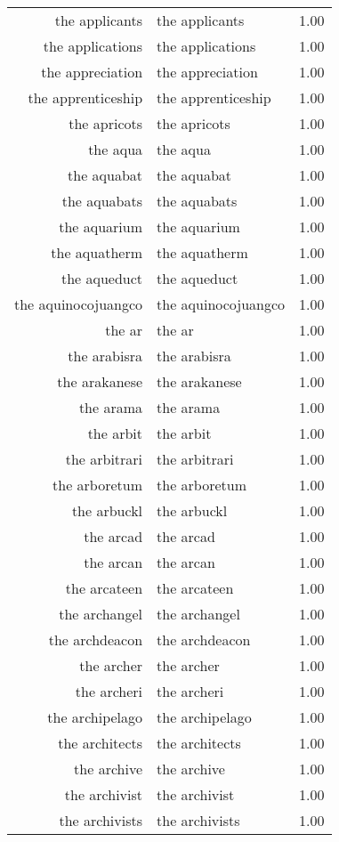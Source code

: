 \begin{table}[ht]
\begin{tabular}{rlr}
  the applicants & the applicants & 1.00 \\ 
  the applications & the applications & 1.00 \\ 
  the appreciation & the appreciation & 1.00 \\ 
  the apprenticeship & the apprenticeship & 1.00 \\ 
  the apricots & the apricots & 1.00 \\ 
  the aqua & the aqua & 1.00 \\ 
  the aquabat & the aquabat & 1.00 \\ 
  the aquabats & the aquabats & 1.00 \\ 
  the aquarium & the aquarium & 1.00 \\ 
  the aquatherm & the aquatherm & 1.00 \\ 
  the aqueduct & the aqueduct & 1.00 \\ 
  the aquinocojuangco & the aquinocojuangco & 1.00 \\ 
  the ar & the ar & 1.00 \\ 
  the arabisra & the arabisra & 1.00 \\ 
  the arakanese & the arakanese & 1.00 \\ 
  the arama & the arama & 1.00 \\ 
  the arbit & the arbit & 1.00 \\ 
  the arbitrari & the arbitrari & 1.00 \\ 
  the arboretum & the arboretum & 1.00 \\ 
  the arbuckl & the arbuckl & 1.00 \\ 
  the arcad & the arcad & 1.00 \\ 
  the arcan & the arcan & 1.00 \\ 
  the arcateen & the arcateen & 1.00 \\ 
  the archangel & the archangel & 1.00 \\ 
  the archdeacon & the archdeacon & 1.00 \\ 
  the archer & the archer & 1.00 \\ 
  the archeri & the archeri & 1.00 \\ 
  the archipelago & the archipelago & 1.00 \\ 
  the architects & the architects & 1.00 \\ 
  the archive & the archive & 1.00 \\ 
  the archivist & the archivist & 1.00 \\ 
  the archivists & the archivists & 1.00 \\ 

\end{tabular}
\end{table}
